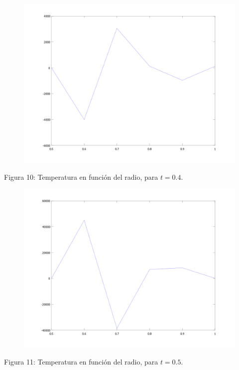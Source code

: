 ﻿\documentclass[%
final,
%
reprint,
%
notitlepage,
narroweqnarray,
inline,
twoside,
invited
]{ieee}
\begin{document}
\begin{figure}[H]
	\begin{center}
	\includegraphics[scale=0.2]{./img/div5.png}
	\end{center}
\end{figure}
\begin{center}
\par Figura 10: Temperatura en función del radio, para $t=0.4$.
\end{center}

\begin{figure}[H]
	\begin{center}
	\includegraphics[scale=0.2]{./img/div6.png}
	\end{center}
\end{figure}
\begin{center}
\par Figura 11: Temperatura en función del radio, para $t=0.5$.
\end{center}
\end{document}
